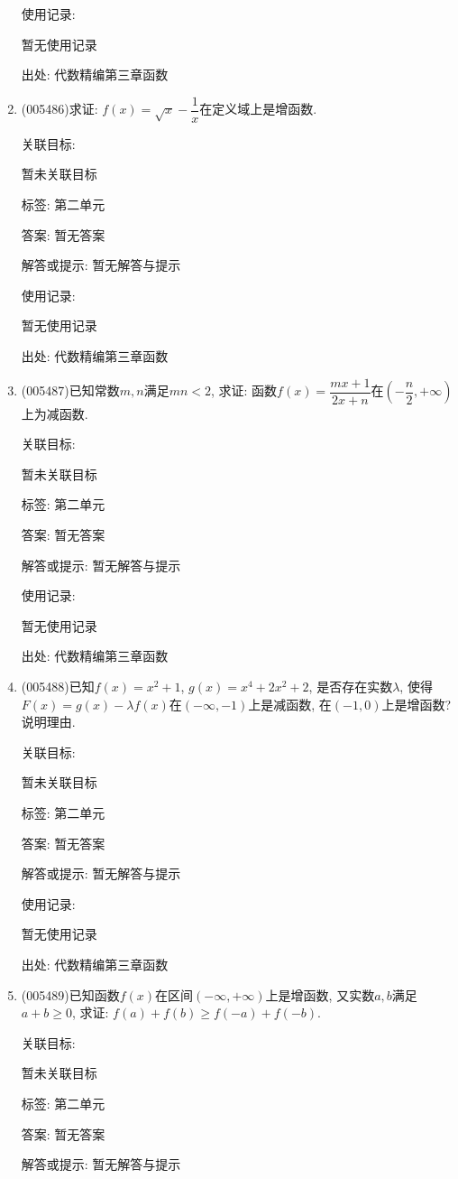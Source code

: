\documentclass[10pt,a4paper]{article}
\begin{document}
\begin{enumerate}[1.]
使用记录:

暂无使用记录


出处: 代数精编第三章函数
\item { (005486)}求证: $f(x)=\sqrt x-\dfrac 1x$在定义域上是增函数.


关联目标:

暂未关联目标



标签: 第二单元

答案: 暂无答案

解答或提示: 暂无解答与提示

使用记录:

暂无使用记录


出处: 代数精编第三章函数
\item { (005487)}已知常数$m,n$满足$mn<2$, 求证: 函数$f(x)=\dfrac{mx+1}{2x+n}$在$(-\dfrac n2,+\infty)$上为减函数.


关联目标:

暂未关联目标



标签: 第二单元

答案: 暂无答案

解答或提示: 暂无解答与提示

使用记录:

暂无使用记录


出处: 代数精编第三章函数
\item { (005488)}已知$f(x)=x^2+1$, $g(x)=x^4+2x^2+2$, 是否存在实数$\lambda$, 使得$F(x)=g(x)-\lambda f(x)$在$(-\infty ,-1)$上是减函数, 在$(-1,0)$上是增函数? 说明理由.


关联目标:

暂未关联目标



标签: 第二单元

答案: 暂无答案

解答或提示: 暂无解答与提示

使用记录:

暂无使用记录


出处: 代数精编第三章函数
\item { (005489)}已知函数$f(x)$在区间$(-\infty ,+\infty)$上是增函数, 又实数$a,b$满足$a+b\ge 0$, 求证: $f(a)+f(b)\ge f(-a)+f(-b)$.


关联目标:

暂未关联目标



标签: 第二单元

答案: 暂无答案

解答或提示: 暂无解答与提示


\end{enumerate}
\end{document}
